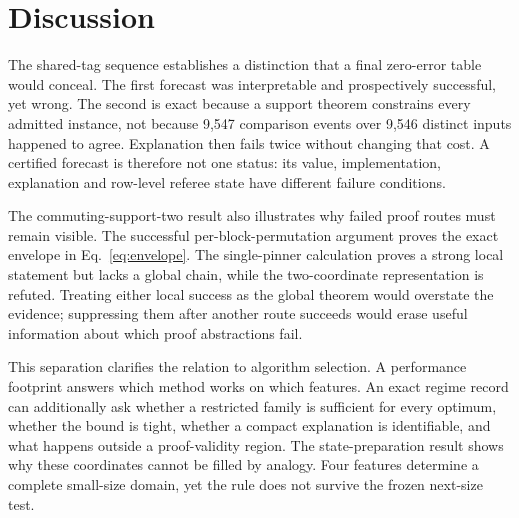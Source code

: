 \section{Discussion}

The shared-tag sequence establishes a distinction that a final zero-error table would conceal.  The first forecast was interpretable and prospectively successful, yet wrong.  The second is exact because a support theorem constrains every admitted instance, not because 9,547 comparison events over 9,546 distinct inputs happened to agree.  Explanation then fails twice without changing that cost.  A certified forecast is therefore not one status: its value, implementation, explanation and row-level referee state have different failure conditions.

The commuting-support-two result also illustrates why failed proof routes must remain visible.  The successful per-block-permutation argument proves the exact envelope in Eq.~\eqref{eq:envelope}.  The single-pinner calculation proves a strong local statement but lacks a global chain, while the two-coordinate representation is refuted.  Treating either local success as the global theorem would overstate the evidence; suppressing them after another route succeeds would erase useful information about which proof abstractions fail.

This separation clarifies the relation to algorithm selection.  A performance footprint answers which method works on which features.  An exact regime record can additionally ask whether a restricted family is sufficient for every optimum, whether the bound is tight, whether a compact explanation is identifiable, and what happens outside a proof-validity region.  The state-preparation result shows why these coordinates cannot be filled by analogy.  Four features determine a complete small-size domain, yet the rule does not survive the frozen next-size test.

